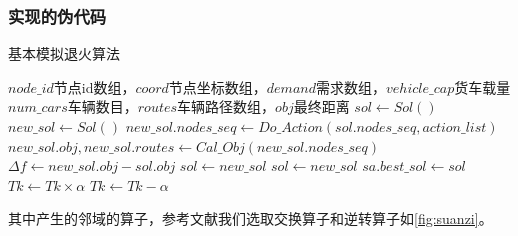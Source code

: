 \documentclass{nudt}
\begin{document}
\subsubsection{实现的伪代码}
\begin{algorithm}[H]
	\caption{基本模拟退火算法}  
	\label{alg:Basic SA}
	\begin{algorithmic}[1] %
		\Require $node\_id$节点id数组，$coord$节点坐标数组，$demand$需求数组，$vehicle\_cap$货车载量 
		\Ensure $num\_cars$车辆数目，$routes$车辆路径数组，$obj$最终距离  
		\State $sol \gets Sol()$
					\State $new\_sol \gets Sol()$ 
					\State $new\_sol.nodes\_seq \gets Do\_Action(sol.nodes\_seq, action\_list)$ 
					\State $new\_sol.obj, new\_sol.routes \gets Cal\_Obj(new\_sol.nodes\_seq)$
					\State $ \Delta f \gets new\_sol.obj - sol.obj $
						\State $sol \gets new\_sol$
					\EndIf
						\State $sol \gets new\_sol$
						\State $sa.best\_sol \gets sol$
					\EndIf
				\EndFor
				$Tk\gets Tk\times \alpha$
			\EndIf
			$Tk\gets Tk- \alpha$
			\EndIf
			\EndWhile   
		\EndProcedure  
	\end{algorithmic}  
\end{algorithm} 
其中产生的邻域的算子，参考文献\cite{wuling}我们选取交换算子和逆转算子如\cref{fig:suanzi}。
\end{document}
